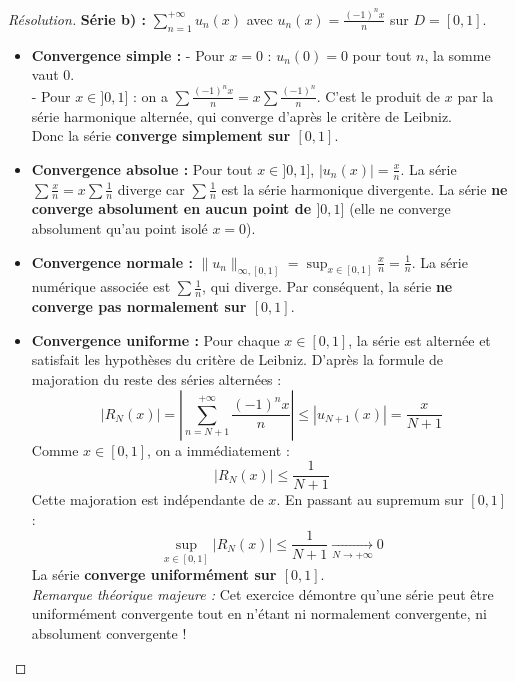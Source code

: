 \documentclass[12pt,a4paper]{report}
\begin{document}
\begin{proof}[Résolution]
\textbf{Série b) :} $\sum_{n=1}^{+\infty} u_n(x)$ avec $u_n(x) = \frac{(-1)^n x}{n}$ sur $D = [0, 1]$.
\begin{itemize}
    \item \textbf{Convergence simple :}
    - Pour $x = 0$ : $u_n(0) = 0$ pour tout $n$, la somme vaut 0.\\
    - Pour $x \in ]0, 1]$ : on a $\sum \frac{(-1)^n x}{n} = x \sum \frac{(-1)^n}{n}$. C'est le produit de $x$ par la série harmonique alternée, qui converge d'après le critère de Leibniz.\\
    Donc la série \textbf{converge simplement sur $[0, 1]$}.
    \item \textbf{Convergence absolue :}
    Pour tout $x \in ]0, 1]$, $|u_n(x)| = \frac{x}{n}$. La série $\sum \frac{x}{n} = x \sum \frac{1}{n}$ diverge car $\sum \frac{1}{n}$ est la série harmonique divergente.
    La série \textbf{ne converge absolument en aucun point de $]0, 1]$} (elle ne converge absolument qu'au point isolé $x = 0$).
    \item \textbf{Convergence normale :}
    $\|u_n\|_{\infty, [0, 1]} = \sup_{x \in [0, 1]} \frac{x}{n} = \frac{1}{n}$.
    La série numérique associée est $\sum \frac{1}{n}$, qui diverge.
    Par conséquent, la série \textbf{ne converge pas normalement sur $[0, 1]$}.
    \item \textbf{Convergence uniforme :}
    Pour chaque $x \in [0, 1]$, la série est alternée et satisfait les hypothèses du critère de Leibniz. D'après la formule de majoration du reste des séries alternées :
    \[ |R_N(x)| = \left| \sum_{n=N+1}^{+\infty} \frac{(-1)^n x}{n} \right| \le |u_{N+1}(x)| = \frac{x}{N+1} \]
    Comme $x \in [0, 1]$, on a immédiatement :
    \[ |R_N(x)| \le \frac{1}{N+1} \]
    Cette majoration est indépendante de $x$. En passant au supremum sur $[0, 1]$ :
    \[ \sup_{x \in [0, 1]} |R_N(x)| \le \frac{1}{N+1} \xrightarrow[N \to +\infty]{} 0 \]
    La série \textbf{converge uniformément sur $[0, 1]$}.\\
    \textit{Remarque théorique majeure :} Cet exercice démontre qu'une série peut être uniformément convergente tout en n'étant ni normalement convergente, ni absolument convergente !
\end{itemize}


\end{proof}
\end{document}
